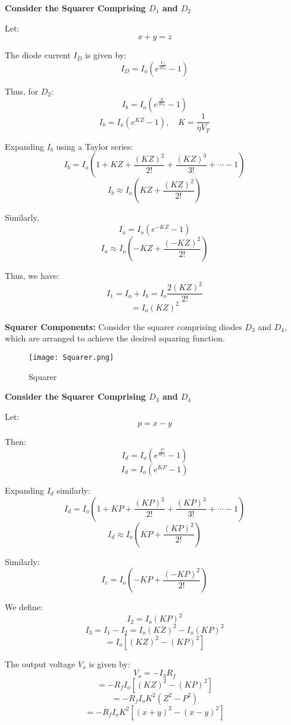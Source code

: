 \documentclass[a4paper,9pt,twoside,openany,twocolumn]{memoir}
\begin{document}
\textbf{Consider the Squarer Comprising \( D_1 \) and \( D_2 \)}


Let:
\[
x + y = z
\]

The diode current \( I_D \) is given by:
\[
I_D = I_o \left(e^{\frac{V_f}{\eta V_T}} - 1\right) \tag{1}
\]

Thus, for \( D_2 \):
\[
I_b = I_o \left(e^{\frac{Z}{\eta V_T}} - 1\right) \tag{2}
\]
\[
I_b = I_o \left(e^{KZ} - 1\right), \quad K = \frac{1}{\eta V_T} \tag{3}
\]

Expanding \( I_b \) using a Taylor series:
\[
I_b = I_o \left(1 + KZ + \frac{(KZ)^2}{2!} + \frac{(KZ)^3}{3!} + \cdots - 1\right) \tag{4}
\]
\[
I_b \approx I_o \left(KZ + \frac{(KZ)^2}{2!}\right) \tag{5}
\]

Similarly,
\[
I_a = I_o \left(e^{-KZ} - 1\right) \tag{6}
\]
\[
I_a \approx I_o \left(-KZ + \frac{(-KZ)^2}{2!}\right) \tag{7}
\]

Thus, we have:
\[
I_1 = I_a + I_b = I_o \frac{2(KZ)^2}{2!} \tag{8}
\]
\[
= I_o (KZ)^2 \tag{9}
\]

\textbf{Squarer Components:} Consider the squarer comprising diodes \( D_3 \) and \( D_4 \), which are arranged to achieve the desired squaring function.

\begin{figure}[h]
    \centering
    \texttt{[image: Squarer.png]} %
    \caption{Squarer}
    \label{fig:squarer}
\end{figure}

\textbf{Consider the Squarer Comprising \( D_3 \) and \( D_4 \)}


Let:
\[
p = x - y
\]

Then:
\[
I_d = I_o \left(e^{\frac{P}{\eta V_T}} - 1\right) \tag{10}
\]
\[
I_d = I_o \left(e^{KP} - 1\right) \tag{11}
\]

Expanding \( I_d \) similarly:
\[
I_d = I_o \left(1 + KP + \frac{(KP)^2}{2!} + \frac{(KP)^3}{3!} + \cdots - 1\right) \tag{12}
\]
\[
I_d \approx I_o \left(KP + \frac{(KP)^2}{2!}\right) \tag{13}
\]

Similarly:
\[
I_c = I_o \left(-KP + \frac{(-KP)^2}{2!}\right) \tag{14}
\]

We define:
\[
I_2 = I_o (KP)^2 \tag{15}
\]
\[
I_3 = I_1 - I_2 = I_o (KZ)^2 - I_o (KP)^2 \tag{16}
\]
\[
= I_o \left[(KZ)^2 - (KP)^2\right] \tag{17}
\]

The output voltage \( V_o \) is given by:
\[
V_o = -I_3 R_f \tag{18}
\]
\[
= -R_f I_o \left[(KZ)^2 - (KP)^2\right] \tag{19}
\]
\[
= -R_f I_o K^2 (Z^2 - P^2) \tag{20}
\]
\[
= -R_f I_o K^2 \left[(x + y)^2 - (x - y)^2\right] \tag{21}
\]
\end{document}
